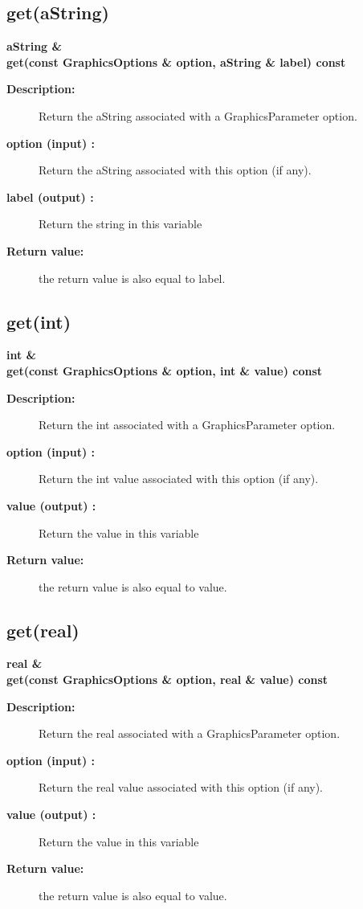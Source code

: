 \subsection{get(aString)}
 
\begin{flushleft} \textbf{%
aString \&  \\ 
\settowidth{\GraphicsParametersIncludeArgIndent}{get(}%
get(const GraphicsOptions \& option, aString \& label) const
}\end{flushleft}
\begin{description}
\item[{\bf Description:}] 
   Return the aString associated with a GraphicsParameter option.
\item[{\bf option (input) :}]  Return the aString associated with this option (if any).
\item[{\bf label (output) :}]  Return the string in this variable
\item[{\bf Return value:}]  the return value is also equal to label.
\end{description}
\subsection{get(int)}
 
\begin{flushleft} \textbf{%
int \&  \\ 
\settowidth{\GraphicsParametersIncludeArgIndent}{get(}%
get(const GraphicsOptions \& option, int \& value) const
}\end{flushleft}
\begin{description}
\item[{\bf Description:}] 
   Return the int associated with a GraphicsParameter option.
\item[{\bf option (input) :}]  Return the int value associated with this option (if any).
\item[{\bf value (output) :}]  Return the value in this variable
\item[{\bf Return value:}]  the return value is also equal to value.
\end{description}
\subsection{get(real)}
 
\begin{flushleft} \textbf{%
real \&   \\ 
\settowidth{\GraphicsParametersIncludeArgIndent}{get(}%
get(const GraphicsOptions \& option, real \& value) const
}\end{flushleft}
\begin{description}
\item[{\bf Description:}] 
   Return the real associated with a GraphicsParameter option.
\item[{\bf option (input) :}]  Return the real value associated with this option (if any).
\item[{\bf value (output) :}]  Return the value in this variable
\item[{\bf Return value:}]  the return value is also equal to value.
\end{description}
